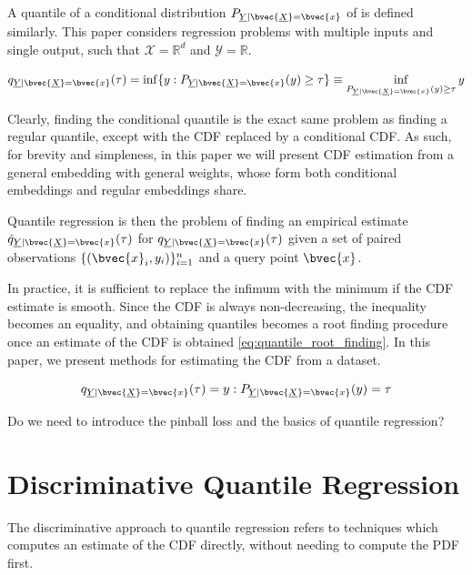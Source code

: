 \documentclass[twoside]{article} \usepackage{aistats2017}
\newcommand{\rv}[1]{\underline{#1}}
\newcommand{\warn}[1]{{\color{RedOrange} #1}}
\begin{document}
		A quantile of a conditional distribution $P_{\rv{Y} | \bvec{\rv{X}} = \bvec{x}}$ of is defined similarly. This paper considers regression problems with multiple inputs and single output, such that $\mathcal{X} = \mathbb{R}^{d}$ and $\mathcal{Y} = \mathbb{R}$.
		
		\begin{equation}
			q_{\rv{Y} | \bvec{\rv{X}} = \bvec{x}}(\tau) = \inf\{y : P_{\rv{Y} | \bvec{\rv{X}} = \bvec{x}}(y) \geq \tau\} \equiv \inf_{P_{\rv{Y} | \bvec{\rv{X}} = \bvec{x}}(y) \geq \tau} y
		\label{eq:conditional_quantile}
		\end{equation}
		
		Clearly, finding the conditional quantile is the exact same problem as finding a regular quantile, except with the CDF replaced by a conditional CDF. As such, for brevity and simpleness, in this paper we will present CDF estimation from a general embedding with general weights, whose form both conditional embeddings and regular embeddings share.
		
		Quantile regression is then the problem of finding an empirical estimate $\hat{q}_{\rv{Y} | \bvec{\rv{X}} = \bvec{x}}(\tau)$ for $q_{\rv{Y} | \bvec{\rv{X}} = \bvec{x}}(\tau)$ given a set of paired observations $\{(\bvec{x}_{i}, y_{i})\}_{i = 1}^{n}$ and a query point $\bvec{x}$.
		
		In practice, it is sufficient to replace the infimum with the minimum if the CDF estimate is smooth. Since the CDF is always non-decreasing, the inequality becomes an equality, and obtaining quantiles becomes a root finding procedure once an estimate of the CDF is obtained \eqref{eq:quantile_root_finding}. In this paper, we present methods for estimating the CDF from a dataset. 
		
		\begin{equation}
			q_{\rv{Y} | \bvec{\rv{X}} = \bvec{x}}(\tau) = y : P_{\rv{Y} | \bvec{\rv{X}} = \bvec{x}}(y) = \tau
		\label{eq:quantile_root_finding}
		\end{equation}	
	
		\warn{Do we need to introduce the pinball loss and the basics of quantile regression?}
	
\section{Discriminative Quantile Regression}

	The discriminative approach to quantile regression refers to techniques which computes an estimate of the CDF directly, without needing to compute the PDF first.
	
\end{document}
